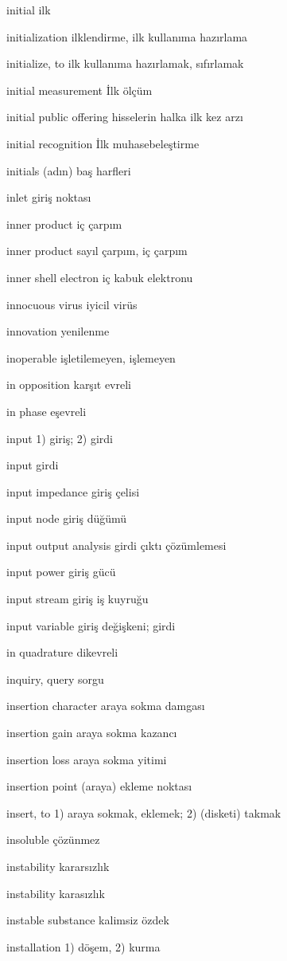 \documentclass[12pt,fleqn]{article}\usepackage{../../common}
\begin{document}
initial ilk

initialization ilklendirme, ilk kullanıma hazırlama

initialize, to ilk kullanıma hazırlamak, sıfırlamak

initial measurement İlk ölçüm

initial public offering hisselerin halka ilk kez arzı

initial recognition İlk muhasebeleştirme

initials (adın) baş harfleri

inlet giriş noktası

inner product iç çarpım

inner product sayıl çarpım, iç çarpım

inner shell electron iç kabuk elektronu

innocuous virus iyicil virüs

innovation yenilenme

inoperable işletilemeyen, işlemeyen

in opposition karşıt evreli

in phase eşevreli

input 1) giriş; 2) girdi

input girdi

input impedance giriş çelisi

input node giriş düğümü

input output analysis girdi çıktı çözümlemesi

input power giriş gücü

input stream giriş iş kuyruğu

input variable giriş değişkeni; girdi

in quadrature dikevreli

inquiry, query sorgu

insertion character araya sokma damgası

insertion gain araya sokma kazancı

insertion loss araya sokma yitimi

insertion point (araya) ekleme noktası

insert, to 1) araya sokmak, eklemek; 2) (disketi) takmak

insoluble çözünmez

instability kararsızlık

instability karasızlık

instable substance kalimsiz özdek

installation 1) döşem, 2) kurma
\end{document}
